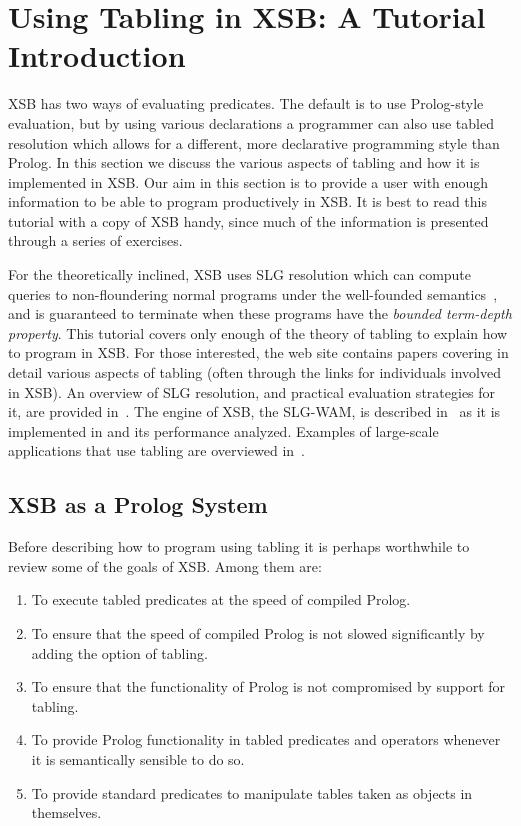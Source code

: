 
\chapter{Using Tabling in XSB: A Tutorial Introduction} 
\label{chap:TablingOverview}

XSB has two ways of evaluating predicates.  The default is to use
Prolog-style evaluation, but by using various declarations a
programmer can also use tabled resolution which allows for a
different, more declarative programming style than Prolog.  In this
section we discuss the various aspects of tabling and how it is
implemented in XSB\@.  Our aim in this section is to provide a user
with enough information to be able to program productively in XSB\@.
It is best to read this tutorial with a copy of XSB handy, since much
of the information is presented through a series of exercises.

For the theoretically inclined, XSB uses SLG resolution which can
compute queries to non-floundering normal programs under the
well-founded semantics~\cite{VGRS91}, and is guaranteed to terminate
when these programs have the {\em bounded term-depth property}.  This
tutorial covers only enough of the theory of tabling to explain how to
program in XSB\@.  For those interested, the web site contains papers
covering in detail various aspects of tabling (often through the links
for individuals involved in XSB)\@.  An overview of SLG resolution,
and practical evaluation strategies for it, are provided
in~\cite{ChWa96,Swif99b,SaSW99,FSW98}.  The engine of XSB, the
SLG-WAM, is described in~\cite{SaSw98,RRSSW98,JFLP-Scheduling,SaSW96,
ChSW95,CAT@PLILP-98,TST99,CuSW99b} as it is implemented in \version{}
and its performance analyzed.  Examples of large-scale applications
that use tabling are overviewed in~\cite{syntactica, semantica,
CoDS96, DRW96, RRRSSW97, Boul97,CuSW99a,GSTPD00}.


\section{XSB as a Prolog System}
\label{tabling_env}

Before describing how to program using tabling it is perhaps
worthwhile to review some of the goals of XSB\@.  Among them are:
\begin{enumerate}
\item	To execute tabled predicates at the speed of compiled Prolog.
\item	To ensure that the speed of compiled Prolog is not slowed
	significantly by adding the option of tabling.
\item	To ensure that the functionality of Prolog is not compromised
 	by support for tabling.
\item   To provide Prolog functionality in tabled predicates and
	operators whenever it is semantically sensible to do so.
\item	To provide standard predicates to manipulate tables
	taken as objects in themselves.
\end{enumerate}

